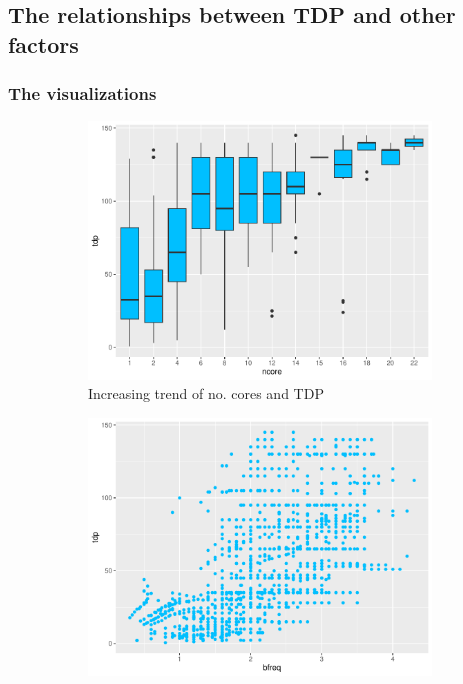 \subsection{The relationships between TDP and other factors}

\subsubsection{The visualizations}
\label{section:data_analysis_visualizations}

\begin{figure}[H]
    \centering
    \begin{subfigure}[b]{0.45\textwidth}
        \centering
        \includegraphics[width=\textwidth]{./graphics/box_tdp_ncore.pdf}
        \caption{Increasing trend of no. cores and TDP}
        \label{fig:tdp_analysis_ncore}
    \end{subfigure}
    \hfill
    \begin{subfigure}[b]{0.45\textwidth}
        \centering
        \includegraphics[width=\textwidth]{./graphics/scatter_tdp_bfreq.pdf}

\end{subfigure}
\end{figure}
